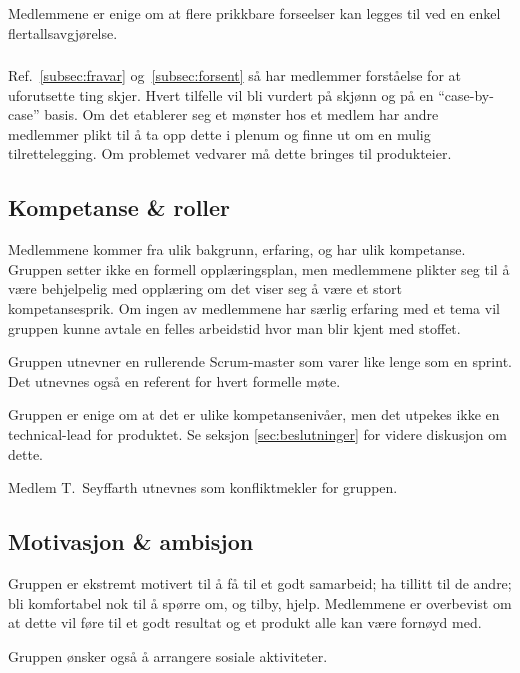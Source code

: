 \documentclass[11pt]{article}
\begin{document}
	Medlemmene er enige om at flere prikkbare forseelser kan legges til ved en enkel flertallsavgjørelse.
	
	\subsubsection{}
	\label{subsec:individbasis}
	Ref.~\ref{subsec:fravar} og~\ref{subsec:forsent} så har medlemmer forståelse for at uforutsette ting skjer. Hvert tilfelle vil bli vurdert på skjønn og på en ``case-by-case'' basis. Om det etablerer seg et mønster hos et medlem har andre medlemmer plikt til å ta opp dette i plenum og finne ut om en mulig tilrettelegging. Om problemet vedvarer må dette bringes til produkteier.
	
	\subsection{Kompetanse \& roller}
	\label{subsec:kompetanse}
	Medlemmene kommer fra ulik bakgrunn, erfaring, og har ulik kompetanse. Gruppen setter ikke en formell opplæringsplan, men medlemmene plikter seg til å være behjelpelig med opplæring om det viser seg å være et stort kompetansesprik. Om ingen av medlemmene har særlig erfaring med et tema vil gruppen kunne avtale en felles arbeidstid hvor man blir kjent med stoffet.
	
	\label{subsec:roller}
	Gruppen utnevner en rullerende Scrum-master som varer like lenge som en sprint. Det utnevnes også en referent for hvert formelle møte. 
	
	Gruppen er enige om at det er ulike kompetansenivåer, men det utpekes ikke en technical-lead for produktet. Se seksjon \ref{sec:beslutninger} for videre diskusjon om dette. 
	
	Medlem T.~Seyffarth utnevnes som konfliktmekler for gruppen.
	
	
	\subsection{Motivasjon \& ambisjon}
	\label{subsec:motivasjon}
	Gruppen er ekstremt motivert til å få til et godt samarbeid; ha tillitt til de andre; bli komfortabel nok til å spørre om, og tilby, hjelp. Medlemmene er overbevist om at dette vil føre til et godt resultat og et produkt alle kan være fornøyd med. 
	
	Gruppen ønsker også å arrangere sosiale aktiviteter. 
	
\end{document}
